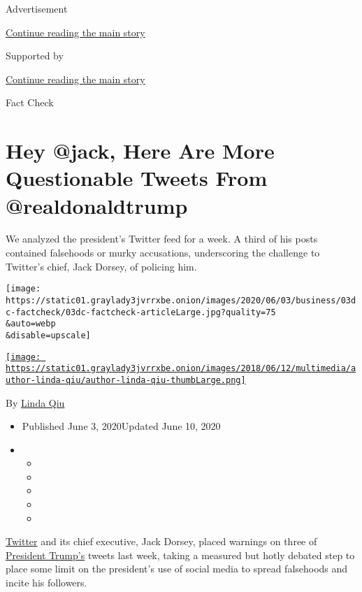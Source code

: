 Advertisement

\protect\hyperlink{after-top}{Continue reading the main story}

Supported by

\protect\hyperlink{after-sponsor}{Continue reading the main story}

Fact Check

\hypertarget{hey-jack-here-are-more-questionable-tweets-from-realdonaldtrump}{%
\section{Hey @jack, Here Are More Questionable Tweets From
@realdonaldtrump}\label{hey-jack-here-are-more-questionable-tweets-from-realdonaldtrump}}

We analyzed the president's Twitter feed for a week. A third of his
posts contained falsehoods or murky accusations, underscoring the
challenge to Twitter's chief, Jack Dorsey, of policing him.

\texttt{[image: https://static01.graylady3jvrrxbe.onion/images/2020/06/03/business/03dc-factcheck/03dc-factcheck-articleLarge.jpg?quality=75\\\&auto=webp\\\&disable=upscale]}

\href{https://www.nytimes3xbfgragh.onion/by/linda-qiu}{\texttt{[image: https://static01.graylady3jvrrxbe.onion/images/2018/06/12/multimedia/author-linda-qiu/author-linda-qiu-thumbLarge.png]}}

By \href{https://www.nytimes3xbfgragh.onion/by/linda-qiu}{Linda Qiu}

\begin{itemize}
\item
  Published June 3, 2020Updated June 10, 2020
\item
  \begin{itemize}
  \item
  \item
  \item
  \item
  \item
  \end{itemize}
\end{itemize}

\href{https://www.nytimes3xbfgragh.onion/2020/06/09/us/politics/trump-twitter.html}{Twitter}
and its chief executive, Jack Dorsey, placed warnings on three of
\href{https://www.nytimes3xbfgragh.onion/2020/06/09/us/politics/trump-twitter.html}{President
Trump's} tweets last week, taking a measured but hotly debated step to
place some limit on the president's use of social media to spread
falsehoods and incite his followers.

